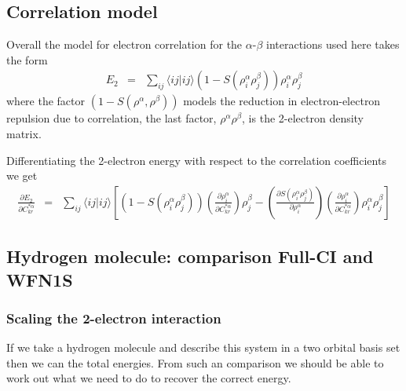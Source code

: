 \documentclass[pra]{revtex4-1}
\begin{document}
\subsection{Correlation model}

Overall the model for electron correlation for the $\alpha$-$\beta$ interactions
used here takes the form
\begin{eqnarray}
  E_2 &=& \sum_{ij} \langle ij | ij \rangle 
          \left(1-S(\rho^\alpha_i\rho^\beta_j)\right) \rho^\alpha_i\rho^\beta_j
\end{eqnarray}
where the factor $(1-S(\rho^\alpha,\rho^\beta))$ models the reduction in electron-electron repulsion
due to correlation, the last factor, $\rho^\alpha\rho^\beta$, is the 2-electron density matrix.

Differentiating the 2-electron energy with respect to the correlation coefficients we get
\begin{eqnarray}
  \frac{\partial E_2}{\partial C^{*\alpha}_{kr}}
  &=& \sum_{ij}\langle ij | ij \rangle \left[
          \left(1-S(\rho^\alpha_i\rho^\beta_j)\right)
          \left(\frac{\partial\rho^\alpha_i}{\partial C^{*\alpha}_{kr}}\right)\rho^\beta_j
        - \left(\frac{\partial S(\rho^\alpha_i\rho^\beta_j)}{\partial\rho^\alpha_i}\right)
          \left(\frac{\partial \rho^\alpha_i}{\partial C^{*\alpha}_{kr}}\right)
          \rho^\alpha_i\rho^\beta_j
      \right]
\end{eqnarray}

\subsection{Hydrogen molecule: comparison Full-CI and WFN1S}

\subsubsection{Scaling the 2-electron interaction}

If we take a hydrogen molecule and describe this system in a two orbital basis set then
we can the total energies. From such an comparison we should be able to work out what we need
to do to recover the correct energy. 
\end{document}
